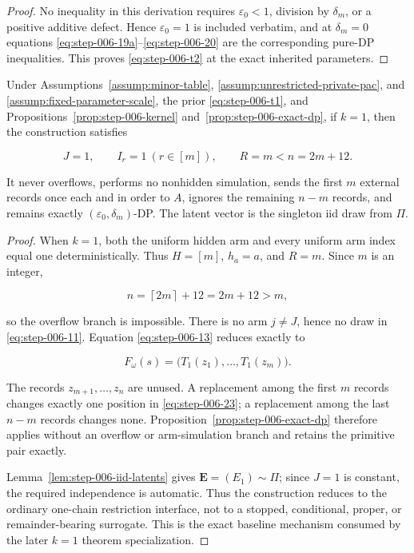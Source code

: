 \begin{proof}
No inequality in this derivation requires \(\varepsilon_0<1\), division by \(\delta_m\), or a positive additive defect. Hence \(\varepsilon_0=1\) is included verbatim, and at \(\delta_m=0\) equations \eqref{eq:step-006-19a}--\eqref{eq:step-006-20} are the corresponding pure-DP inequalities. This proves \eqref{eq:step-006-t2} at the exact inherited parameters.

\end{proof}


\begin{proposition}
\label{prop:step-006-one-arm}

Under Assumptions~\ref{assump:minor-table}, \ref{assump:unrestricted-private-pac}, and \ref{assump:fixed-parameter-scale}, the prior \eqref{eq:step-006-t1}, and Propositions~\ref{prop:step-006-kernel} and~\ref{prop:step-006-exact-dp}, if \(k=1\), then the construction satisfies

\[
J=1,
\qquad I_r=1\ (r\in[m]),
\qquad R=m<n=2m+12.
\tag{21}\label{eq:step-006-21}
\]

It never overflows, performs no nonhidden simulation, sends the first \(m\) external records once each and in order to \(A\), ignores the remaining \(n-m\) records, and remains exactly \((\varepsilon_0,\delta_m)\)-DP. The latent vector is the singleton iid draw from \(\Pi\).

\end{proposition}

\begin{proof}

When \(k=1\), both the uniform hidden arm and every uniform arm index equal one deterministically. Thus \(H=[m]\), \(h_a=a\), and \(R=m\). Since \(m\) is an integer,

\[
n=\left\lceil 2m\right\rceil+12=2m+12>m,
\tag{22}\label{eq:step-006-22}
\]

so the overflow branch is impossible. There is no arm \(j\ne J\), hence no draw in \eqref{eq:step-006-11}. Equation \eqref{eq:step-006-13} reduces exactly to

\[
F_\omega(s)
=\bigl(T_1(z_1),\ldots,T_1(z_m)\bigr).
\tag{23}\label{eq:step-006-23}
\]

The records \(z_{m+1},\ldots,z_n\) are unused. A replacement among the first \(m\) records changes exactly one position in \eqref{eq:step-006-23}; a replacement among the last \(n-m\) records changes none. Proposition~\ref{prop:step-006-exact-dp} therefore applies without an overflow or arm-simulation branch and retains the primitive pair exactly.

Lemma~\ref{lem:step-006-iid-latents} gives \(\mathbf{E}=(E_1) \sim \Pi\); since \(J=1\) is constant, the required independence is automatic. Thus the construction reduces to the ordinary one-chain restriction interface, not to a stopped, conditional, proper, or remainder-bearing surrogate. This is the exact baseline mechanism consumed by the later \(k=1\) theorem specialization.

\end{proof}

